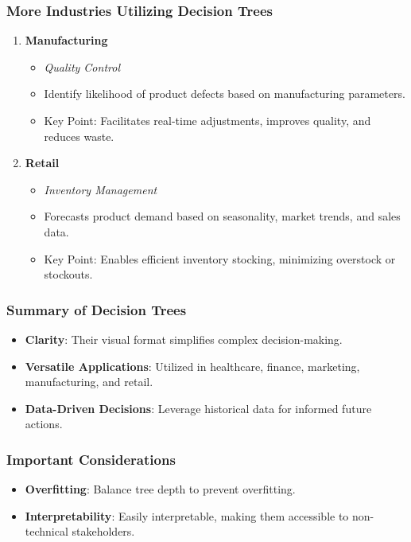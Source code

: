 \documentclass[aspectratio=169]{beamer}
\begin{document}
\begin{frame}[fragile]
    \frametitle{More Industries Utilizing Decision Trees}
    \begin{enumerate}[start=4]
        \item \textbf{Manufacturing}
            \begin{itemize}
                \item \textit{Quality Control}
                \item Identify likelihood of product defects based on manufacturing parameters.
                \item Key Point: Facilitates real-time adjustments, improves quality, and reduces waste.
            \end{itemize}

        \item \textbf{Retail}
            \begin{itemize}
                \item \textit{Inventory Management}
                \item Forecasts product demand based on seasonality, market trends, and sales data.
                \item Key Point: Enables efficient inventory stocking, minimizing overstock or stockouts.
            \end{itemize}
    \end{enumerate}
\end{frame}

\begin{frame}[fragile]
    \frametitle{Summary of Decision Trees}
    \begin{itemize}
        \item \textbf{Clarity}: Their visual format simplifies complex decision-making.
        \item \textbf{Versatile Applications}: Utilized in healthcare, finance, marketing, manufacturing, and retail.
        \item \textbf{Data-Driven Decisions}: Leverage historical data for informed future actions.
    \end{itemize}
\end{frame}

\begin{frame}[fragile]
    \frametitle{Important Considerations}
    \begin{itemize}
        \item \textbf{Overfitting}: Balance tree depth to prevent overfitting.
        \item \textbf{Interpretability}: Easily interpretable, making them accessible to non-technical stakeholders.
    \end{itemize}
\end{frame}
\end{document}
